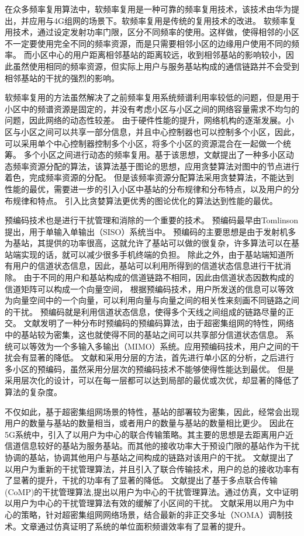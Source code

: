 在众多频率复用算法中，软频率复用是一种可靠的频率复用技术，该技术由华为提出，并应用与4G组网的场景下。软频率复用是传统的复用技术的改进。
软频率复用技术，通过设定发射功率门限，区分不同频率的使用。这样做，使得相邻的小区不一定要使用完全不同的频率资源，而是只需要相邻小区的边缘用户使用不同的频率。
而小区中心的用户距离相邻基站的距离较远，收到相邻基站的影响较小，因此虽然使用相同的频率资源，但实际上用户与服务基站构成的通信链路并不会受到相邻基站的干扰的强烈的影响。

软频率复用的方法虽然解决了之前频率复用系统频谱利用率较低的问题，但是用于小区中的频谱资源是固定的，并没有考虑小区与小区之间的网络容量需求不均匀的问题，因此网络的动态性较差。
由于硬件性能的提升，网络机构的逐渐发展。小区与小区之间可以共享一部分信息，并且中心控制器也可以控制多个小区，因此，可以采用单个中心控制器控制多个小区，将多个小区的资源混合在一起做一个统筹。
多个小区之间进行动态的频率复用。基于该思想，文献\cite{4LRA}提出了一种多小区动态频率资源分配的算法，该算法基于图论的思想，应用贪婪算法对图中的节点进行着色，完成频率资源的分配。
但是该频率资源分配算法采用贪婪算法，不能达到性能的最优，需要进一步的引入小区中基站的分布规律和分布特点，以及用户的分布规律和特点。
引入比贪婪算法更优秀的图论优化的算法达到性能的最优。

预编码技术也是进行干扰管理和消除的一个重要的技术。
预编码最早由Tomlinson提出，用于单输入单输出（SISO）系统当中。
预编码的主要思想是由于发射机多为基站，其提供的功率很高，这就允许了基站可以做的很复杂，许多算法可以在基站端实现的话，就可以减少很多手机终端的负担。
除此之外，由于基站端知道所有用户的信道状态信息，因此，基站可以利用所得到的信道状态信息进行干扰消除。
由于不同的用户和基站构成的信道链路不相同，因此由信道状态因数构成的信道矩阵可以构成一个向量空间，
根据预编码技术，用户所发送的信息可以等效为向量空间中的一个向量，可以利用向量与向量之间的相关性来刻画不同链路之间的干扰。
预编码就是利用信道状态信息，使得多个天线之间组成的链路尽量的正交。
文献\cite{DisPrecode}发明了一种分布时预编码的预编码算法，由于超密集组网的特性，网络中的基站较为密集，这也就使得不同的基站之间可以共享部分信道状态信息。
系统可以等效为一个多输入多输出（MIMO）系统。应用预编码技术，用户之间的干扰会有显著的降低。
文献\cite{LayerPrecode}和\cite{Layer2Precode}采用分层的方法，首先进行单小区的分析，之后进行多小区的预编码，虽然采用分层次的预编码技术不能够使得性能达到最优。
但是采用层次化的设计，可以在每一层都可以达到局部的最优或次优，却显著的降低了算法的复杂度。

不仅如此，基于超密集组网场景的特性，基站的部署较为密集，因此，经常会出现用户的数量与基站的数量相当，或者用户的数量与基站的数量相比更少。
因此在5G系统中，引入了以用户为中心的联合传输策略。其主要的思想是去距离用户近信道信息较好的基站为服务基站。而其他的接收功率大于预设门限的基站作为干扰协调的基站，协调其他用户与基站之间构成的链路对该用户的干扰。
文献\cite{Ucent}提出了以用户为重新的干扰管理算法，并且引入了联合传输技术，用户的总的接收功率有了显著的提升，干扰的功率有了显著的降低。
文献\cite{CoMPUDN}提出了基于多点联合传输(CoMP)的干扰管理算法,提出以用户为中心的干扰管理算法。通过仿真，文中证明以用户为中心的干扰管理算法有效的缓解了小区间的干扰。
文献\cite{UNOMAcent}采用以用户为中心的策略，针对超密集组网网络场景，结合最新的非正交多址（NOMA）调制技术。文章通过仿真证明了系统的单位面积频谱效率有了显著的提升。

